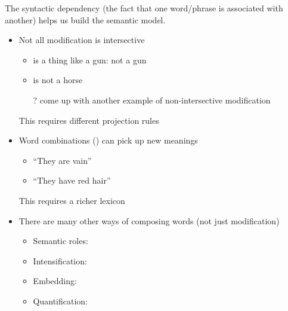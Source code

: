 \documentclass[a4paper,landscape,headrule,footrule,xetex]{foils}
\begin{document}
The syntactic dependency (the fact that one word/phrase is associated
with another) helps us build the semantic model.  


\begin{itemize}\addtolength{\itemsep}{-1ex}
\item Not all modification is intersective
  \begin{itemize}
  \item {} is a thing like a gun: not a gun
  \item {} is not a horse
  \item[?] come up with another example of non-intersective modification\task 
  \end{itemize}
  This requires different projection rules
\item Word combinations () can pick up new
  meanings
  \begin{itemize}
  \item {} ``They are vain''
  \item {} ``They have red hair''
  \end{itemize}
  This requires a richer lexicon
\item There are many other ways of composing words (not just modification)
  \begin{itemize}
  \item Semantic roles: 
  \item Intensification: 
  \item Embedding: 
  \item Quantification: 
  \end{itemize}
\end{itemize}


\end{document}
